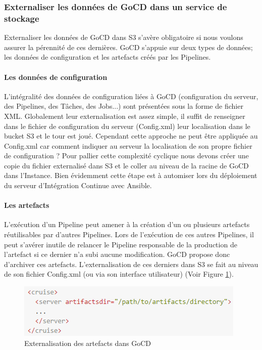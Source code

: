         \subsubsection{Externaliser les données de GoCD dans un service de stockage}
        Externaliser les données de GoCD dans S3 s'avère obligatoire si nous voulons assurer la pérennité de ces dernières. GoCD s'appuie sur deux types de données; les données de configuration et les artefacts créés par les Pipelines.

          \paragraph{Les données de configuration} L'intégralité des données de configuration liées à GoCD (configuration du serveur, des Pipelines, des Tâches, des Jobs...) sont présentées sous la forme de fichier XML. Globalement leur externalisation est assez simple, il suffit de renseigner dans le fichier de configuration du serveur (Config.xml) leur localisation dans le bucket S3 et le tour est joué. Cependant cette approche ne peut être appliquée au Config.xml car comment indiquer au serveur la localisation de son propre fichier de configuration ? Pour pallier cette complexité cyclique nous devons créer une copie du fichier externalisé dans S3 et le coller au niveau de la racine de GoCD dans l'Instance. Bien évidemment cette étape est à automiser lors du déploiement du serveur d'Intégration Continue avec Ansible.

          \paragraph{Les artefacts} L'exécution d'un Pipeline peut amener à la création d'un ou plusieurs artefacts réutilisables par d'autres Pipelines. Lors de l'exécution de ces autres Pipelines, il peut s'avérer inutile de relancer le Pipeline responsable de la production de l'artefact si ce dernier n'a subi aucune modification. GoCD propose donc d'archiver ces artefacts. L'externalisation de ces derniers dans S3 se fait au niveau de son fichier Config.xml (ou via son interface utilisateur) (Voir Figure \ref{ArtifactsDir}).\\

          \begin{figure}
            \begin{center}
              \includegraphics[scale=0.7]{images/ArtifactsDir.png}
            \end{center}
            \caption{Externalisation des artefacts dans GoCD}
            \label{ArtifactsDir}
          \end{figure}

